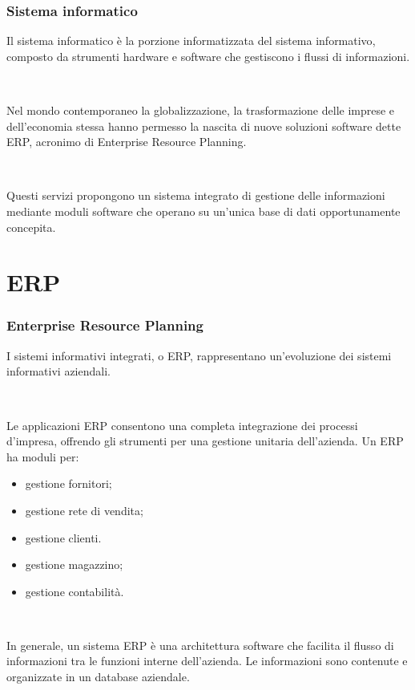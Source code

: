 \documentclass[]{beamer}
\begin{document}
\begin{frame}
\frametitle{Sistema informatico}
Il sistema informatico è la \alert<1>{porzione informatizzata del sistema informativo}, composto da strumenti hardware e software che gestiscono i flussi di informazioni.\pause

~

Nel mondo contemporaneo la globalizzazione, la trasformazione delle imprese e dell'economia stessa hanno permesso la nascita di nuove soluzioni software dette ERP, acronimo di \alert<2>{Enterprise Resource Planning}.\pause

~

Questi servizi propongono un sistema integrato di gestione delle informazioni mediante moduli software che operano su un'unica base di dati opportunamente concepita.
\end{frame}




\section{ERP}

\begin{frame}
\frametitle{Enterprise Resource Planning}
I \alert<1>{sistemi informativi integrati}, o ERP, rappresentano un'evoluzione dei sistemi informativi aziendali.\pause

~

Le applicazioni ERP consentono una completa integrazione dei processi d'impresa, offrendo gli strumenti per una gestione unitaria dell'azienda. Un ERP ha moduli per:
\begin{itemize}
  \item gestione fornitori;
  \item gestione rete di vendita;
  \item gestione clienti.
  \item gestione magazzino;
  \item gestione contabilità.
\end{itemize}\pause

~

In generale, un sistema ERP è una \alert<3>{architettura software} che facilita il flusso di informazioni tra le funzioni interne dell'azienda. Le informazioni sono contenute e organizzate in un \alert<3>{database aziendale}.
\end{frame}
\end{document}
